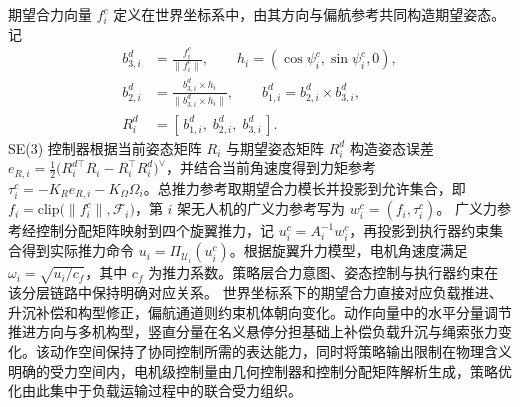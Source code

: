 期望合力向量 $f_i^c$ 定义在世界坐标系中，由其方向与偏航参考共同构造期望姿态。记
\begin{equation}
    \begin{aligned}
        b_{3,i}^d &= \frac{f_i^c}{\|f_i^c\|}, \qquad
        h_i = (\cos\psi_i^c,\sin\psi_i^c,0), \\
        b_{2,i}^d &=
        \frac{b_{3,i}^d\times h_i}{\|b_{3,i}^d\times h_i\|}, \qquad
        b_{1,i}^d = b_{2,i}^d\times b_{3,i}^d, \\
        R_i^d &= [\,b_{1,i}^d,\; b_{2,i}^d,\; b_{3,i}^d\,].
    \end{aligned}
\end{equation}
SE(3) 控制器根据当前姿态矩阵 $R_i$ 与期望姿态矩阵 $R_i^d$ 构造姿态误差 $e_{R,i} = \frac{1}{2}\big(R_i^{d\top}R_i - R_i^\top R_i^d\big)^\vee$，并结合当前角速度得到力矩参考 $\tau_i^c = -K_R e_{R,i} - K_{\Omega}\Omega_i$。总推力参考取期望合力模长并投影到允许集合，即 $f_i = \mathrm{clip}\big(\|f_i^c\|,\mathcal F_i\big)$，第 $i$ 架无人机的广义力参考写为 $w_i^c = (f_i,\tau_i^c)$。
广义力参考经控制分配矩阵映射到四个旋翼推力，记 $u_i^c = A_i^{-1} w_i^c$，再投影到执行器约束集合得到实际推力命令 $u_i = \Pi_{\mathcal U_i}(u_i^c)$。根据旋翼升力模型，电机角速度满足 $\omega_i = \sqrt{u_i/c_f}$，其中 $c_f$ 为推力系数。策略层合力意图、姿态控制与执行器约束在该分层链路中保持明确对应关系。
世界坐标系下的期望合力直接对应负载推进、升沉补偿和构型修正，偏航通道则约束机体朝向变化。动作向量中的水平分量调节推进方向与多机构型，竖直分量在名义悬停分担基础上补偿负载升沉与绳索张力变化。该动作空间保持了协同控制所需的表达能力，同时将策略输出限制在物理含义明确的受力空间内，电机级控制量由几何控制器和控制分配矩阵解析生成，策略优化由此集中于负载运输过程中的联合受力组织。

